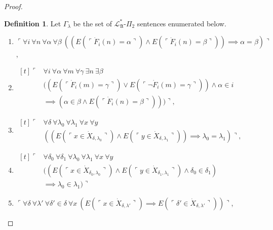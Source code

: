 \documentclass[12pt, twoside]{memoir}
\numberwithin{equation}{section}
\theoremstyle{definition}
\newtheorem{defi}[thm]{Definition}
\theoremstyle{remark}
\theoremstyle{definition}
\theoremstyle{definition}
\theoremstyle{definition}
\theoremstyle{remark}
\begin{document}
\begin{proof}
\begin{defi}\label{defc}
Let $\Gamma_{\lambda}$ be the set of $\mathcal{L}^*_{\mathfrak{A}}$-$\Pi_2$ sentences enumerated below.  
\begin{enumerate}[label=(S\arabic*)$_{\lambda}$, leftmargin=40pt]
    \item\label{c1} $\ulcorner \forall i \ \forall n \ \forall \alpha \ \forall \beta \ ((E(\ulcorner \dot{F}_i (n) = \alpha \urcorner) \wedge E(\ulcorner \dot{F}_i (n) = \beta \urcorner)) \implies \alpha = \beta) \urcorner$,
    
    \item\label{c2}
    \!
    $\begin{aligned}[t]
        \ulcorner & \forall i \ \forall \alpha \ \forall m \ \forall \gamma \ \exists n \ \exists \beta \\
        & ((E(\ulcorner \dot{F}_i (m) = \gamma \urcorner) \vee E(\ulcorner \neg \dot{F}_i (m) = \gamma \urcorner)) \wedge \alpha \in i \\
        & \implies (\alpha \in \beta \wedge E(\ulcorner \dot{F}_i (n) = \beta \urcorner))) \urcorner, 
    \end{aligned}$

    \item\label{c3} 
    \!
    $\begin{aligned}[t]
        \ulcorner & \forall \delta \ \forall \lambda_0 \ \forall \lambda_1 \ \forall x \ \forall y \\
        & ((E(\ulcorner x \in \dot{X}_{\delta, \lambda_0} \urcorner) \wedge E(\ulcorner y \in \dot{X}_{\delta, \lambda_1} \urcorner)) \implies \lambda_0 = \lambda_1) \urcorner,
    \end{aligned}$

    \item\label{c4}
    \!
    $\begin{aligned}[t]
        \ulcorner & \forall \delta_0 \ \forall \delta_1 \ \forall \lambda_0 \ \forall \lambda_1 \ \forall x \ \forall y \\
        & ((E(\ulcorner x \in \dot{X}_{\delta_0, \lambda_0} \urcorner) \wedge E(\ulcorner y \in \dot{X}_{\delta_1, \lambda_1} \urcorner) \wedge \delta_0 \in \delta_1) \\
        & \implies \lambda_0 \in \lambda_1) \urcorner
    \end{aligned}$

    \item\label{c5} $\ulcorner \forall \delta \ \forall \lambda' \ \forall \delta' \in \delta \ \forall x \ (E(\ulcorner x \in \dot{X}_{\delta, \lambda'} \urcorner) \implies E(\ulcorner \delta' \in \dot{X}_{\delta, \lambda'} \urcorner)) \urcorner$, 
    

\end{enumerate}
\end{defi}
\end{proof}
\end{document}
